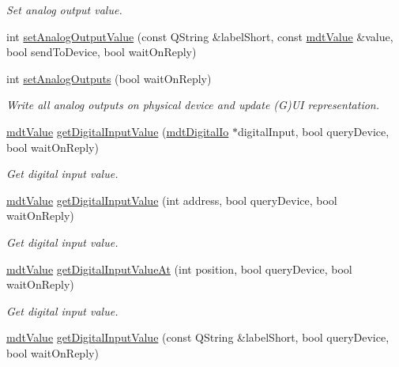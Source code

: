 \begin{DoxyCompactItemize}
\begin{DoxyCompactList}\small\item\em Set analog output value. \end{DoxyCompactList}\item 
int \hyperlink{classmdt_multi_io_device_a35f8cf69f977e3ae8fade0ca9dba09d2}{set\-Analog\-Output\-Value} (const Q\-String \&label\-Short, const \hyperlink{classmdt_value}{mdt\-Value} \&value, bool send\-To\-Device, bool wait\-On\-Reply)
\item 
int \hyperlink{classmdt_multi_io_device_ae8b2ae1657c4072854846893705f427a}{set\-Analog\-Outputs} (bool wait\-On\-Reply)
\begin{DoxyCompactList}\small\item\em Write all analog outputs on physical device and update (G)U\-I representation. \end{DoxyCompactList}\item 
\hyperlink{classmdt_value}{mdt\-Value} \hyperlink{classmdt_multi_io_device_ab149a75e3886518b03059df0c41e1086}{get\-Digital\-Input\-Value} (\hyperlink{classmdt_digital_io}{mdt\-Digital\-Io} $\ast$digital\-Input, bool query\-Device, bool wait\-On\-Reply)
\begin{DoxyCompactList}\small\item\em Get digital input value. \end{DoxyCompactList}\item 
\hyperlink{classmdt_value}{mdt\-Value} \hyperlink{classmdt_multi_io_device_aae5727443591c8008d6d6db6ab521ed7}{get\-Digital\-Input\-Value} (int address, bool query\-Device, bool wait\-On\-Reply)
\begin{DoxyCompactList}\small\item\em Get digital input value. \end{DoxyCompactList}\item 
\hyperlink{classmdt_value}{mdt\-Value} \hyperlink{classmdt_multi_io_device_a4dc1d2e97ec5d835394629203f16ae1a}{get\-Digital\-Input\-Value\-At} (int position, bool query\-Device, bool wait\-On\-Reply)
\begin{DoxyCompactList}\small\item\em Get digital input value. \end{DoxyCompactList}\item 
\hyperlink{classmdt_value}{mdt\-Value} \hyperlink{classmdt_multi_io_device_ae0ab9303a0ca81b6200fc5c7dde66ba2}{get\-Digital\-Input\-Value} (const Q\-String \&label\-Short, bool query\-Device, bool wait\-On\-Reply)
\item 

\end{DoxyCompactItemize}
